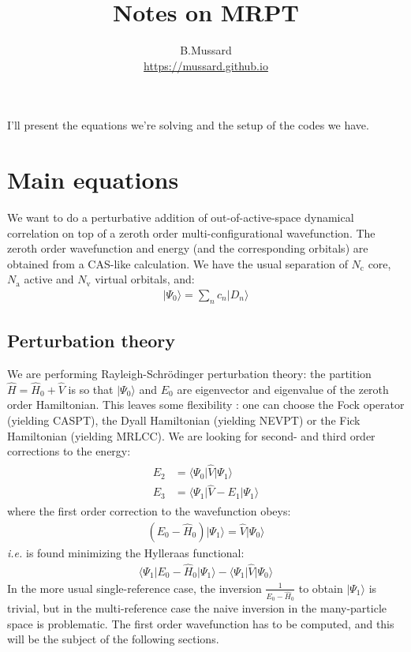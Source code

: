 \documentclass{article}
\newcommand  \equ[2]       {\begin{align}#2\label{#1}\end{align}}
\newcommand  \ket[1]       {\vert #1  \rangle}
\newcommand  \expect[3]    {\langle  #1 \vert #2 \vert #3 \rangle}
\begin{document}
\title{Notes on MRPT}
\author{B.Mussard\\
\url{https://mussard.github.io}
}
\maketitle
\setcounter{tocdepth}{2}
\tableofcontents
\vspace*{2em}

\noindent
I'll present the equations we're solving and the setup of the codes we have.

\section{Main equations}

We want to do a perturbative addition of out-of-active-space dynamical correlation
on top of a zeroth order multi-configurational wavefunction.
The zeroth order wavefunction and energy (and the corresponding orbitals) are obtained from a CAS-like calculation.
We have the usual separation of $N_\text{c}$ core, $N_\text{a}$ active and $N_\text{v}$ virtual orbitals, and:
\equ{ }{
  \ket{\Psi_0}=\sum_n c_n\ket{D_n}
}

\subsection{Perturbation theory}

We are performing Rayleigh-Schr\"{o}dinger perturbation theory:
the partition $\hat{H}=\hat{H}_0+\hat{V}$ is so that $\ket{\Psi_0}$
and $E_0$ are eigenvector and eigenvalue of the zeroth order Hamiltonian. 
This leaves some flexibility : one can choose the Fock operator (yielding CASPT),
the Dyall Hamiltonian (yielding NEVPT) or the Fick Hamiltonian (yielding MRLCC). 
We are looking for second- and third order corrections to the energy:
\equ{eq:energies}{
  \begin{array}{rl}
  E_2&=\expect{\Psi_0}{\hat{V}}{\Psi_1}
  \\[.5em]
  E_3&=\expect{\Psi_1}{\hat{V}-E_1}{\Psi_1}
  \end{array}
}
where the first order correction to the wavefunction obeys:
\equ{eq:hylleraas}{
  (E_0-\hat{H}_0)\ket{\Psi_1}=\hat{V}\ket{\Psi_0}
}
\textit{i.e.} is found minimizing the Hylleraas functional:
\equ{}{
    \expect{\Psi_1}{E_0-\hat{H}_0}{\Psi_1}-\expect{\Psi_1}{\hat{V}}{\Psi_0}
}
In the more usual single-reference case, the inversion $\frac{1}{E_0-\hat{H}_0}$ to obtain $\ket{\Psi_1}$
is trivial, but in the multi-reference case the naive inversion in the many-particle space is problematic.
The first order wavefunction has to be computed, and this will be the subject of the following sections.
\end{document}
